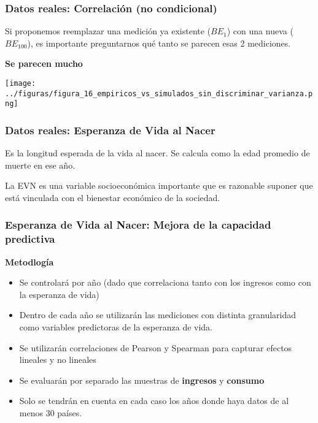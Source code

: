 \documentclass[10pt,mathserif]{beamer}%
\begin{document}
\begin{frame}
    \frametitle{Datos reales: Correlación (no condicional)}
    Si proponemos reemplazar una medición ya existente ($BE_1$) con una nueva ($BE_{100}$), es importante preguntarnos qué tanto se parecen esas 2 mediciones.
    
    \pause

    \textbf{Se parecen mucho}

    \texttt{[image: ../figuras/figura\_16\_empiricos\_vs\_simulados\_sin\_discriminar\_varianza.png]} %
\end{frame}

\begin{frame}
    \frametitle{Datos reales: Esperanza de Vida al Nacer}
    \begin{definition}
        Es la longitud esperada de la vida al nacer. 
        Se calcula como la edad promedio de muerte en ese año.
    \end{definition}

    La EVN es una variable socioeconómica importante que es razonable suponer que está vinculada con el bienestar económico de la sociedad.
\end{frame}

\begin{frame}
    \frametitle{Esperanza de Vida al Nacer: Mejora de la capacidad predictiva}
    \textbf{Metodlogía}
    \begin{itemize}
        \item Se controlará por año (dado que correlaciona tanto con los ingresos como con la esperanza de vida)
        \item Dentro de cada año se utilizarán las mediciones con distinta granularidad como variables predictoras de la esperanza de vida.
        \item Se utilizarán correlaciones de Pearson y Spearman para capturar efectos lineales y no lineales
        \item Se evaluarán por separado las muestras de \textbf{ingresos} y \textbf{consumo}
        \item Solo se tendrán en cuenta en cada caso los años donde haya datos de al menos 30 países.
    \end{itemize}
\end{frame}
\end{document}
